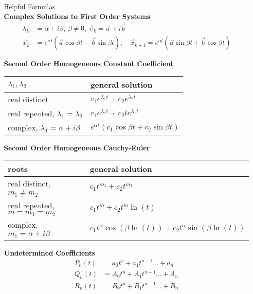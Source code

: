 \begin{center}
    \setlength{\extrarowheight}{0.25cm}
    {\Large Helpful Formulas} \\
    \vspace{12pt}
    \textbf{Complex Solutions to First Order Systems}
    \begin{align*}
        \lambda_k &= \alpha + i \beta, \ \beta \ne 0 , \ \vec v_k = \vec a + i \vec b \\
        \vec x_k &= e^{\alpha t} (\vec a \cos \beta t - \vec b \sin \beta t), \quad 
        \vec x_{k+1} = e^{\alpha t} (\vec a \sin \beta t + \vec b \cos \beta t)
    \end{align*}


    \textbf{Second Order Homogeneous Constant Coefficient}
    \begin{tabular}{ p{4.2cm} p{4.6cm} }
        
        $\lambda_1, \lambda_2$ &  general solution 
        \\[2pt] \hline 
        real distinct &  $c_1 e^{\lambda_1 t} + c_2 e^{\lambda_2 t}$\\       
        real repeated, $\lambda_1 = \lambda_2$ & $c_1 e^{\lambda_1 t} + c_2 t e^{\lambda_1 t}$\\
        complex, $\lambda_1 = \alpha + i \beta$ & $e^{\alpha t} \left( c_1 \cos \beta t + c_2 \sin \beta t \right)$\\[2pt] \hline
    \end{tabular}    
    
    \vspace{12pt}
    \textbf{Second Order Homogeneous Cauchy-Euler}
    \begin{tabular}{ p{6.2cm} p{6cm} }
        roots &  general solution 
        \\[2pt] \hline 
        real distinct, $m_1 \ne m_2$ &  $c_1 t^{m_1} + c_2 t^{m_2}$\\       
        real repeated, $m = m_1 = m_2$ & $c_1 t^{m} + c_2 t^m \ln(t)$\\
        complex, $m_1 = \alpha + i \beta$ & $c_1t^{\alpha}\cos(\beta \ln(t)) + c_2t^{\alpha}\sin(\beta \ln (t))$\\[2pt] \hline
    \end{tabular}
    
    \vspace{12pt}
    \textbf{Undetermined Coefficients}
    \begin{align*}
        P_n(t) &= a_0t^n + a_1t^{n-1} \ldots + a_n \\
        Q_n(t) &= A_0t^n + A_1t^{n-1} \ldots + A_n \\        
        R_n(t) &= B_0t^n + B_1t^{n-1} \ldots + B_n     
    \end{align*}
    

\end{center}
